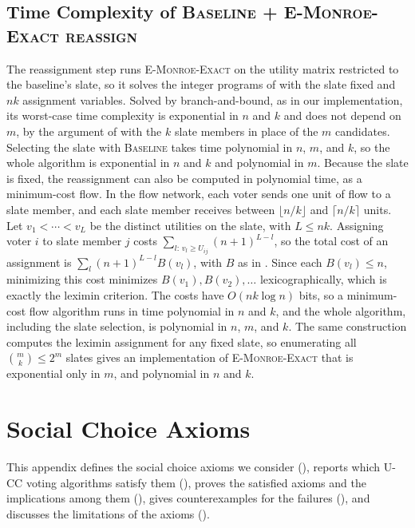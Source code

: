 \documentclass[letterpaper]{article} %
\newcommand{\EExactMonroe}{\textsc{E-Monroe-Exact}}
\newcommand{\Baseline}{\textsc{Baseline}}
\newcommand{\BaselineEMonroeReassign}{\textsc{Baseline + E-Monroe-Exact reassign}}
\begin{document}
\subsection{Time Complexity of \BaselineEMonroeReassign{}}
\label{app:baseline-reassign-complexity}
The reassignment step runs \EExactMonroe{} on the utility matrix restricted to the baseline's slate, so it solves the integer programs of  with the slate fixed and $nk$ assignment variables.
Solved by branch-and-bound, as in our implementation, its worst-case time complexity is exponential in \(n\) and \(k\) and does not depend on \(m\), by the argument of  with the \(k\) slate members in place of the \(m\) candidates.
Selecting the slate with \Baseline{} takes time polynomial in \(n\), \(m\), and \(k\), so the whole algorithm is exponential in \(n\) and \(k\) and polynomial in \(m\).
Because the slate is fixed, the reassignment can also be computed in polynomial time, as a minimum-cost flow.
In the flow network, each voter sends one unit of flow to a slate member, and each slate member receives between $\lfloor n/k\rfloor$ and $\lceil n/k\rceil$ units.
Let $v_1<\cdots<v_L$ be the distinct utilities on the slate, with $L\le nk$.
Assigning voter $i$ to slate member $j$ costs $\sum_{l:\,v_l\ge U_{ij}}(n+1)^{L-l}$, so the total cost of an assignment is $\sum_l (n+1)^{L-l} B(v_l)$, with $B$ as in .
Since each $B(v_l)\le n$, minimizing this cost minimizes $B(v_1),B(v_2),\dots$ lexicographically, which is exactly the leximin criterion.
The costs have $O(nk\log n)$ bits, so a minimum-cost flow algorithm runs in time polynomial in $n$ and $k$, and the whole algorithm, including the slate selection, is polynomial in \(n\), \(m\), and \(k\).
The same construction computes the leximin assignment for any fixed slate, so enumerating all \(\binom{m}{k}\le 2^m\) slates gives an implementation of \EExactMonroe{} that is exponential only in \(m\), and polynomial in \(n\) and \(k\).


\section{Social Choice Axioms}
\label{app:axioms}

This appendix defines the social choice axioms we consider (), reports which \textsc{U-CC} voting algorithms satisfy them (), proves the satisfied axioms and the implications among them (), gives counterexamples for the failures (), and discusses the limitations of the axioms ().
\end{document}

